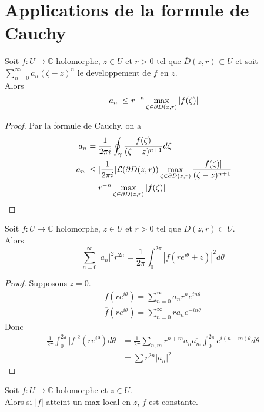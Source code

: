 \documentclass[../main.tex]{subfiles}
\begin{document}
\section{Applications de la formule de Cauchy}
\begin{thm}
	Soit $f:U\to \mathbb{C}$ holomorphe, $z\in U$ et $r>0$ tel que $\overline{D}( z,r) \subset U$ et soit $ \sum_{n=0}^{ \infty }a_n ( \zeta-z)^{n}$ le developpement de $f$ en $z$.\\
	Alors
	\[ 
		|a_n| \leq r^{-n} \max_{\zeta\in \partial D( z,r) } |f( \zeta) |
	\]
	
\end{thm}
\begin{proof}
Par la formule de Cauchy, on a 
\begin{align*}
	a_n &= \frac{1}{2\pi i} \oint_\gamma \frac{f( \zeta) }{( \zeta-z)^{n+1}}d\zeta\\
	|a_n| &\leq |\frac{1}{2\pi i}| \mathcal{L}( \partial D( z,r) ) \max_{\zeta\in \partial D( z,r) } \frac{|f( \zeta) |}{( \zeta-z)^{n+1}}\\
	      &= r^{-n}\max_{\zeta\in \partial D( z,r) } |f( \zeta) |
\end{align*}

\end{proof}
\begin{thm}
	Soit $f:U\to \mathbb{C}$ holomorphe, $z\in U$  et $r>0$ tel que $ \overline{D}( z,r) \subset U$.\\
	Alors
	\[ 
		\sum_{n=0}^{ \infty } |a_n|^{2}r^{2n}= \frac{1}{2\pi} \int_{ 0 }^{ 2\pi }| f(r e^{i\theta}+z) |^{2} d\theta
	\]
	
\end{thm}
\begin{proof}
Supposons $z=0$.\\
\begin{align*}
f( r e^{i\theta} ) = \sum_{n=0}^{ \infty } a_n r^{n} e^{i n \theta} \\
\overline{f}( r e^{i\theta} ) = \sum_{n=0}^{ \infty }r \overline{a_n} e^{-in\theta} 
\end{align*}
Donc
\begin{align*}
	\frac{1}{2\pi} \int_{ 0 }^{ 2\pi }|f|^{2}( r e^{i\theta} ) d\theta &= \frac{1}{2\pi}  \sum_{n,m}^{ } r^{n+m} a_n \overline{a_m} \int_{ 0 }^{ 2\pi } e^{i ( n-m) \theta} d\theta\\
	&= \sum r^{2n}|a_n|^{2}
\end{align*}
\end{proof}
\begin{thm}
	Soit $f:U\to \mathbb{C}$ holomorphe et $z\in U$.\\
	Alors si $|f|$ atteint un max local en $z$, $f$ est constante.
\end{thm}
\end{document}

